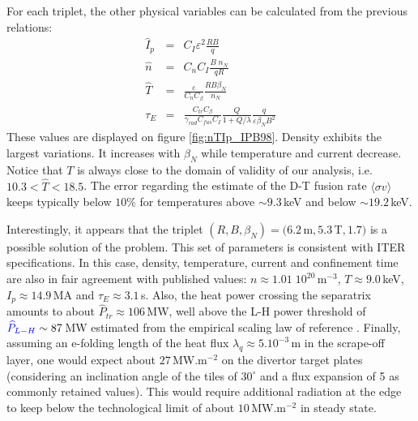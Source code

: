 \documentclass[12pt]{iopart}
\newcommand{\newstuff}[1]{\color{blue}{#1}\color{black}}
\begin{document}
For each triplet, the other physical variables can be calculated from the previous relations:
\begin{eqnarray*}
	\widehat I_p &=& C_I \varepsilon^2 \frac{RB}{q} \\
	\widehat n &=& C_nC_I \frac{B\; n_N}{qR}\\ 
	\widehat T &=& \frac{\varepsilon}{C_nC_\beta} \frac{RB\beta_N}{n_N} \\
    \tau_E &=& \frac{C_{tr}C_\beta}{\gamma_{rad}C_{fus}C_I} \frac{Q}{1+Q/\lambda} 
     \frac{q}{\varepsilon \beta_N B^2}
\end{eqnarray*}
These values are displayed on figure \ref{fig:nTIp_IPB98}. Density exhibits the largest variations. It increases with $\beta_N$ while temperature and current decrease. Notice that $T$ is always close to the domain of validity of our analysis, i.e. $10.3 < \widehat T < 18.5$. The error regarding the estimate of the D-T fusion rate $\langle \sigma v \rangle$ keeps typically below $10\%$ for temperatures above $\sim 9.3\,$keV and below $\sim 19.2\,$keV.

Interestingly, it appears that the triplet $(R,B,\beta_N) = (6.2\,$m$, 5.3\,$T$, 1.7)$ is a possible solution of the problem. This set of parameters is consistent with ITER specifications. In this case, density, temperature, current and confinement time are also in fair agreement with published values: $n \approx 1.01\; 10^{20}\,$m$^{-3}$, $T \approx 9.0\,$keV, $I_p \approx 14.9\,$MA and $\tau_E \approx 3.1\,$s. 
Also, the heat power crossing the separatrix amounts to about $\widehat P_{tr} \approx 106\,$MW, well above the L-H power threshold of $\newstuff{\widehat P_{L-H}}\sim 87\,$MW estimated from the empirical scaling law of reference \cite{Martin2008} \newstuff{(cf. dashed-dotted line on figure \ref{fig:solutions_betaN})}. Finally, assuming an e-folding length of the heat flux $\lambda_q \approx 5.10^{-3}\,$m in the scrape-off layer, one would expect about $27\,$MW.m$^{-2}$ on the divertor target plates (considering an inclination angle of the tiles of $30^\circ$ and a flux expansion of 5 as commonly retained values). This would require additional radiation at the edge to keep below the technological limit of about $10\,$MW.m$^{-2}$ in steady state. \\
\end{document}
